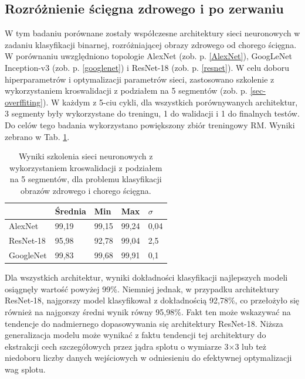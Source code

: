 \subsection{Rozróżnienie ścięgna zdrowego i po zerwaniu}
\label{binaryMRI}
W tym badaniu porównane zostały współczesne architektury sieci neuronowych w zadaniu klasyfikacji binarnej, rozróżniającej obrazy zdrowego od chorego ścięgna. W porównaniu uwzględniono topologie AlexNet (zob. p. \ref{AlexNet}), GoogLeNet Inception-v3 (zob. p. \ref{googlenet}) i ResNet-18 (zob. p. \ref{resnet}). W celu doboru hiperparametrów i optymalizacji parametrów sieci, zastosowano szkolenie z wykorzystaniem kroswalidacji z podziałem na 5 segmentów (zob. p. \ref{sec-overffiting}). W każdym z 5-ciu cykli, dla wszystkich porównywanych architektur, 3 segmenty były wykorzystane do treningu, 1 do walidacji i 1 do finalnych testów. Do celów tego badania wykorzystano powiększony zbiór treningowy RM. Wyniki zebrano w Tab. \ref{tab:binary-cross-validation}.
\vspace{10px}
\renewcommand{\arraystretch}{1.2}
\begin{table}[h!]
	\setlength{\tabcolsep}{14pt}
	\centering
	\caption{Wyniki szkolenia sieci neuronowych z wykorzystaniem kroswalidacji z podziałem na 5 segmentów, dla problemu klasyfikacji obrazów zdrowego i chorego ścięgna.}
	\label{tab:binary-cross-validation}
	\begin{tabular}{l | l | l | l | l }
		 & Średnia & Min   & Max   & $\sigma$   \\ \hline \hline
		AlexNet   & 99,19 & 99,15 & 99,24 & 0,04 \\ \hline
		ResNet-18 & 95,98 & 92,78 & 99,04 & 2,5  \\ \hline
		GoogleNet & 99,83 & 99,68 & 99,91 & 0,1  \\ \hline
	\end{tabular}
\end{table}
\renewcommand{\arraystretch}{1}
\newpage
Dla wszystkich architektur, wyniki dokładności klasyfikacji najlepszych modeli osiągnęły wartość powyżej 99\%. Niemniej jednak, w przypadku architektury ResNet-18, najgorszy model klasyfikował z dokładnością 92,78\%, co przełożyło się również na najgorszy średni wynik równy 95,98\%. Fakt ten może wskazywać na tendencje \linebreak do nadmiernego dopasowywania się architektury ResNet-18. Niższa generalizacja modelu może wynikać z faktu tendencji tej architektury do ekstrakcji cech szczegółowych przez jądra splotu o wymiarze 3$\times$3 lub też niedoboru liczby danych wejściowych w odniesieniu do efektywnej optymalizacji wag splotu.

